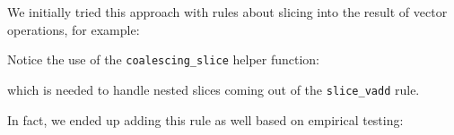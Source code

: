 We initially tried this approach with rules about slicing into the result of vector operations, for example:


Notice the use of the \texttt{coalescing_slice} helper function:


\noindent which is needed to handle nested slices coming out of the \texttt{slice_vadd} rule.

In fact, we ended up adding this rule as well based on empirical testing:


